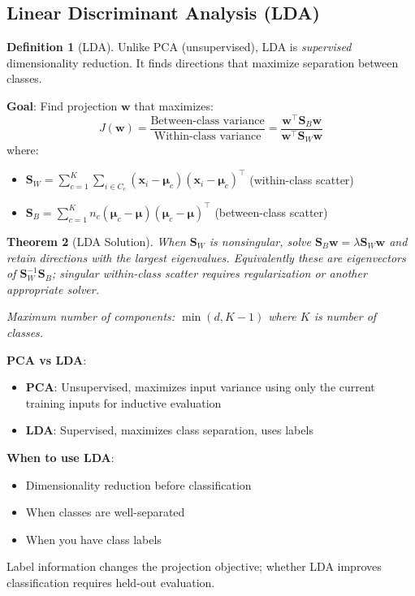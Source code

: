 \documentclass[11pt,twoside]{article}
\numberwithin{equation}{section}
\newcommand{\vect}[1]{\bm{#1}}
\newcommand{\mat}[1]{\bm{#1}}
\theoremstyle{plain}
\newtheorem{theorem}{Theorem}[section]
\theoremstyle{definition}
\newtheorem{definition}[theorem]{Definition}
\theoremstyle{remark}
\newenvironment{keyidea}{
  \begin{tcolorbox}[colback=yellow!5!white,
                    colframe=yellow!50!black,
                    title=Key Idea,
                    breakable,
                    enhanced,
                    sharp corners,
                    boxrule=0.8pt,
                    left=6pt, right=6pt, top=6pt, bottom=6pt]
}{
  \end{tcolorbox}
}
\begin{document}
\subsection{Linear Discriminant Analysis (LDA)}

\begin{definition}[LDA]
Unlike PCA (unsupervised), LDA is \emph{supervised} dimensionality reduction. It finds directions that maximize separation between classes.

\textbf{Goal}: Find projection $\vect{w}$ that maximizes:
\[
J(\vect{w}) = \frac{\text{Between-class variance}}{\text{Within-class variance}} = \frac{\vect{w}^\top \mat{S}_B \vect{w}}{\vect{w}^\top \mat{S}_W \vect{w}}
\]
where:
\begin{itemize}
\item $\mat{S}_W = \sum_{c=1}^K \sum_{i \in C_c} (\vect{x}_i - \vect{\mu}_c)(\vect{x}_i - \vect{\mu}_c)^\top$ (within-class scatter)
\item $\mat{S}_B = \sum_{c=1}^K n_c (\vect{\mu}_c - \vect{\mu})(\vect{\mu}_c - \vect{\mu})^\top$ (between-class scatter)
\end{itemize}
\end{definition}

\begin{theorem}[LDA Solution]
When $\mat{S}_W$ is nonsingular, solve $\mat{S}_B\vect{w}=\lambda\mat{S}_W\vect{w}$ and retain directions with the largest eigenvalues. Equivalently these are eigenvectors of $\mat{S}_W^{-1}\mat{S}_B$; singular within-class scatter requires regularization or another appropriate solver.

Maximum number of components: $\min(d, K-1)$ where $K$ is number of classes.
\end{theorem}

\begin{keyidea}
\textbf{PCA vs LDA}:
\begin{itemize}
\item \textbf{PCA}: Unsupervised, maximizes input variance using only the current training inputs for inductive evaluation
\item \textbf{LDA}: Supervised, maximizes class separation, uses labels
\end{itemize}

\textbf{When to use LDA}:
\begin{itemize}
\item Dimensionality reduction before classification
\item When classes are well-separated
\item When you have class labels
\end{itemize}

Label information changes the projection objective; whether LDA improves classification requires held-out evaluation.
\end{keyidea}
\end{document}

